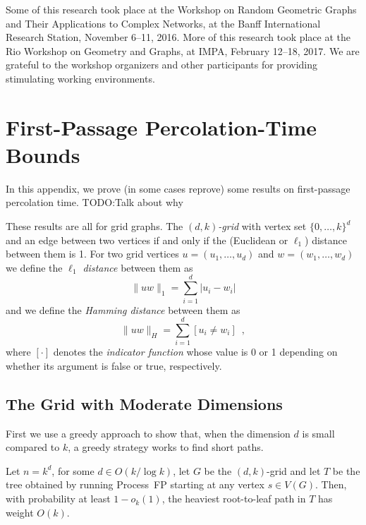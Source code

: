 \documentclass[lotsofwhite]{patmorin}
\begin{document}
Some of this research took place at the Workshop on Random Geometric
Graphs and Their Applications to Complex Networks, at the Banff
International Research Station, November 6--11, 2016.  More of this
research took place at the Rio Workshop on Geometry and Graphs, at IMPA,
February 12--18, 2017.  We are grateful to the workshop organizers and
other participants for providing stimulating working environments.




\appendix
\section{First-Passage Percolation-Time Bounds}

In this appendix, we prove (in some cases reprove) some results on
first-passage percolation time.
TODO:Talk about why

These results are all for grid graphs.  The \emph{$(d,k)$-grid} with
vertex set $\{0,\ldots,k\}^d$ and an edge between two vertices if
and only if the (Euclidean or $\ell_1$) distance between them is 1.
For two grid vertices $u=(u_1,\ldots,u_d)$ and $w=(w_1,\ldots,w_d)$
we define the \emph{$\ell_1$ distance} between them as
\[
   \|uw\|_1 = \sum_{i=1}^d |u_i-w_i|
\]
and we define the \emph{Hamming distance} between them as
\[
   \|uw\|_H = \sum_{i=1}^d [u_i\neq w_i] \enspace ,
\]
where $[\cdot]$ denotes the \emph{indicator function} whose value is 0
or 1 depending on whether its argument is false or true, respectively.

\subsection{The Grid with Moderate Dimensions}

First we use a greedy approach to show that, when the dimension $d$
is small compared to $k$, a greedy strategy works to find short paths.

\begin{thm}
   Let $n=k^d$, for some $d\in O(k/\log k)$, let $G$ be the $(d,k)$-grid
   and let $T$ be the tree obtained by running Process~FP starting at
   any vertex $s\in V(G)$.  Then, with probability at least $1-o_k(1)$,
   the heaviest root-to-leaf path in $T$ has weight $O(k)$.
\end{thm}
\end{document}
